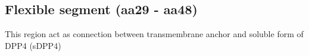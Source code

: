 \subsection{Flexible segment (aa29 - aa48)}

This  region act as connection between transmembrane anchor and soluble form of DPP4 (sDPP4) 
